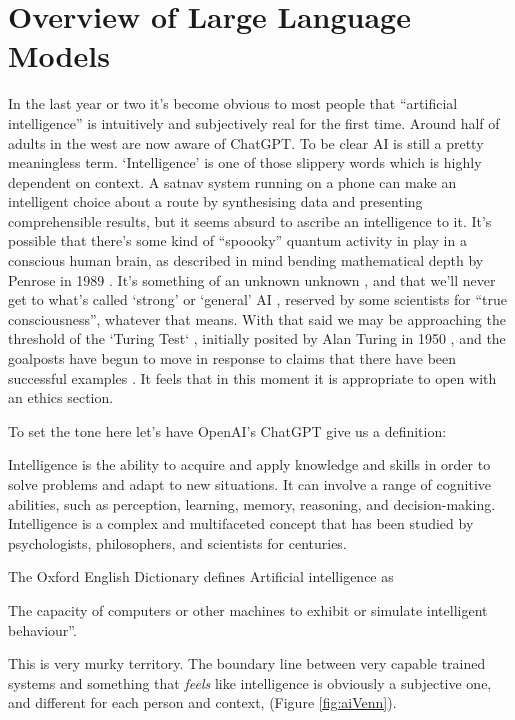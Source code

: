 
\section{Overview of Large Language Models}
In the last year or two it's become obvious to most people that ``artificial intelligence'' is intuitively and subjectively real for the first time. Around half of adults in the west are now aware of ChatGPT. To be clear AI is still a pretty meaningless term. `Intelligence' is one of those slippery words which is highly dependent on context. A satnav system running on a phone can make an intelligent choice about a route by synthesising data and presenting comprehensible results, but it seems absurd to ascribe an intelligence to it. It's possible that there's some kind of ``spoooky'' quantum activity in play in a conscious human brain, as described in mind bending mathematical depth by Penrose in 1989 \cite{penrose1990emperor}. It's something of an unknown unknown \cite{kerskens2022experimental}, and that we'll never get to what's called `strong' or `general' AI \cite{larson2021myth, searle1980minds}, reserved by some scientists for ``true consciousness'', whatever that means. With that said we may be approaching the threshold of the `Turing Test` \cite{sep-turing-test}, initially posited by Alan Turing in 1950 \cite{turing1950computing}, and the goalposts have begun to move in response to claims that there have been successful examples \cite{warwick2016can, french2012moving, french2000turing, searle2009turing}. It feels that in this moment it is appropriate to open with an ethics section.\par
To set the tone here let's have OpenAI's ChatGPT give us a definition:
\begin{tcolorbox}[enhanced, frame style={fill=lightgray}, interior style={fill=lightgray}]Intelligence is the ability to acquire and apply knowledge and skills in order to solve problems and adapt to new situations. It can involve a range of cognitive abilities, such as perception, learning, memory, reasoning, and decision-making. Intelligence is a complex and multifaceted concept that has been studied by psychologists, philosophers, and scientists for centuries.
\end{tcolorbox}
The Oxford English Dictionary defines Artificial intelligence as 
\begin{tcolorbox}[enhanced, frame style={fill=lightgray}, interior style={fill=lightgray}]The capacity of computers or other machines to exhibit or simulate intelligent behaviour''.
\end{tcolorbox} 
This is very murky territory. The boundary line between very capable trained systems and something that \textit{feels} like intelligence is obviously a subjective one, and different for each person and context, (Figure \ref{fig:aiVenn}).\par

